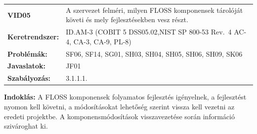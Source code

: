 \documentclass[12pt,magyar,a4paper,oneside]{scrreprt}
\begin{document}
\begin{longtable}[]{@{}ll@{}}
\toprule
\endhead
\begin{minipage}[t]{0.16\columnwidth}\raggedright
\textbf{VID05}\strut
\end{minipage} & \begin{minipage}[t]{0.79\columnwidth}\raggedright
A szervezet felméri, milyen FLOSS komponensek tárolóját követi és mely
fejlesztésekben vesz részt.\strut
\end{minipage}\tabularnewline
\begin{minipage}[t]{0.16\columnwidth}\raggedright
\textbf{Keretrendszer:}\strut
\end{minipage} & \begin{minipage}[t]{0.79\columnwidth}\raggedright
ID.AM-3 (COBIT 5 DSS05.02,NIST SP 800-53 Rev.~4 AC-4, CA-3, CA-9,
PL-8)\strut
\end{minipage}\tabularnewline
\begin{minipage}[t]{0.16\columnwidth}\raggedright
\textbf{Problémák:}\strut
\end{minipage} & \begin{minipage}[t]{0.79\columnwidth}\raggedright
SF06, SF14, SG01, SH03, SH04, SH05, SH06, SH09, SK06\strut
\end{minipage}\tabularnewline
\begin{minipage}[t]{0.16\columnwidth}\raggedright
\textbf{Javaslatok:}\strut
\end{minipage} & \begin{minipage}[t]{0.79\columnwidth}\raggedright
JF01\strut
\end{minipage}\tabularnewline
\begin{minipage}[t]{0.16\columnwidth}\raggedright
\textbf{Szabályozás:}\strut
\end{minipage} & \begin{minipage}[t]{0.79\columnwidth}\raggedright
3.1.1.1.\strut
\end{minipage}\tabularnewline
\bottomrule
\end{longtable}

\textbf{Indoklás: } A FLOSS komponensek folyamatos fejlesztés
igényelnek, a fejlesztést nyomon kell követni, a módosításokat lehetőség
szerint vissza kell vezetni az eredeti projektbe. A komponensmódosítások
visszavezetése során információ szivároghat ki.
\end{document}
